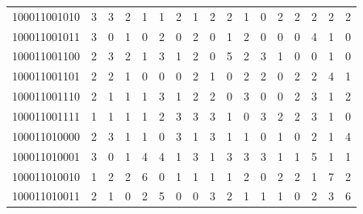 \documentclass[10pt,a4paper]{article}
\begin{document}
\begin{longtable}{ |c|c|c|c|c|c|c|c|c|c|c|c|c|c|c|c|c| }
    100011001010              & 3                            & 3                                & 2                            & 1                              & 1   & 2   & 1   & 2   & 2   & 1   & 0   & 2   & 2   & 2   & 2   & 2   \\
    100011001011              & 3                            & 0                                & 1                            & 0                              & 2   & 0   & 2   & 0   & 1   & 2   & 0   & 0   & 0   & 4   & 1   & 0   \\
    100011001100              & 2                            & 3                                & 2                            & 1                              & 3   & 1   & 2   & 0   & 5   & 2   & 3   & 1   & 0   & 0   & 1   & 0   \\
    100011001101              & 2                            & 2                                & 1                            & 0                              & 0   & 0   & 2   & 1   & 0   & 2   & 2   & 0   & 2   & 2   & 4   & 1   \\
    100011001110              & 2                            & 1                                & 1                            & 1                              & 3   & 1   & 2   & 2   & 0   & 3   & 0   & 0   & 2   & 3   & 1   & 2   \\
    100011001111              & 1                            & 1                                & 1                            & 1                              & 2   & 3   & 3   & 3   & 1   & 0   & 3   & 2   & 2   & 3   & 1   & 0   \\
    100011010000              & 2                            & 3                                & 1                            & 1                              & 0   & 3   & 1   & 3   & 1   & 1   & 0   & 1   & 0   & 2   & 1   & 4   \\
    100011010001              & 3                            & 0                                & 1                            & 4                              & 4   & 1   & 3   & 1   & 3   & 3   & 3   & 1   & 1   & 5   & 1   & 1   \\
    100011010010              & 1                            & 2                                & 2                            & 6                              & 0   & 1   & 1   & 1   & 1   & 2   & 0   & 2   & 2   & 1   & 7   & 2   \\
    100011010011              & 2                            & 1                                & 0                            & 2                              & 5   & 0   & 0   & 3   & 2   & 1   & 1   & 1   & 0   & 2   & 3   & 6   \\

\end{longtable}
\end{document}
